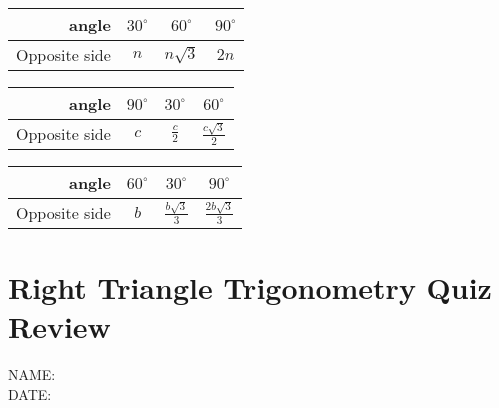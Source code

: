 \documentclass[12pt]{article}
\begin{document}
\begin{multicols}{2}

\begin{center}
{\renewcommand{\arraystretch}{2}
\begin{tabular}{r | c | c | c}

	angle & $30^{\circ}$ & $60^{\circ}$ & $90^{\circ}$\\ \hline
	Opposite side & $n$ & $n\sqrt{3}$ & $2n$

\end{tabular}}\quad


{\renewcommand{\arraystretch}{2}
\begin{tabular}{r | c | c | c}

	angle & $90^{\circ}$ & $30^{\circ}$ & $60^{\circ}$\\ \hline
	Opposite side & $c$ & $\frac{c}{2}$ & $\frac{c\sqrt{3}}{2}$

\end{tabular}}\quad
\end{center}

\end{multicols}

\vspace{12pt}

\begin{center}
{\renewcommand{\arraystretch}{2}
\begin{tabular}{r | c | c | c}

	angle & $60^{\circ}$ & $30^{\circ}$ & $90^{\circ}$\\ \hline
	Opposite side & $b$ & $\frac{b\sqrt{3}}{3}$ & $\frac{2b\sqrt{3}}{3}$

\end{tabular}}\quad

\end{center}

\section*{Right Triangle Trigonometry Quiz Review}

\vspace{12pt}

 \hfill NAME:\underline{\hspace{3in}}\\
 
 \hfill DATE:\underline{\hspace{2in}}\\
\end{document}
